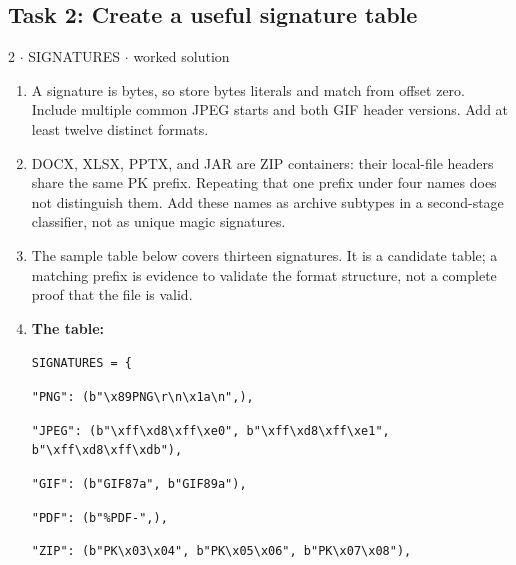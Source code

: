 \documentclass[11pt]{article}
\begin{document}
\begin{keepsection}\subsection{Task 2: Create a useful signature table}

\begin{workedbox}{2 \ensuremath{\cdot} SIGNATURES \ensuremath{\cdot} worked solution}
\begin{enumerate}
\item A signature is bytes, so store bytes literals and match from offset zero. Include multiple common JPEG starts and both GIF header versions. Add at least twelve distinct formats.
\item DOCX, XLSX, PPTX, and JAR are ZIP containers: their local-file headers share the same PK prefix. Repeating that one prefix under four names does not distinguish them. Add these names as archive subtypes in a second-stage classifier, not as unique magic signatures.
\item The sample table below covers thirteen signatures. It is a candidate table; a matching prefix is evidence to validate the format structure, not a complete proof that the file is valid.
\item {}
\textbf{The table:}
\begin{tcolorbox}[colback=Paperblue,colframe=Paperblue,boxrule=0pt,arc=0pt,left=7pt,right=7pt,top=5pt,bottom=5pt]\small\sloppy
\noindent\hspace*{0em}\texttt{SIGNATURES = \{}\par
\noindent\hspace*{1em}\texttt{"PNG": (b"\textbackslash{}x89PNG\textbackslash{}r\textbackslash{}n\textbackslash{}x1a\textbackslash{}n",),}\par
\noindent\hspace*{1em}\texttt{"JPEG": (b"\textbackslash{}xff\textbackslash{}xd8\textbackslash{}xff\textbackslash{}xe0", b"\textbackslash{}xff\textbackslash{}xd8\textbackslash{}xff\textbackslash{}xe1", b"\textbackslash{}xff\textbackslash{}xd8\textbackslash{}xff\textbackslash{}xdb"),}\par
\noindent\hspace*{1em}\texttt{"GIF": (b"GIF87a", b"GIF89a"),}\par
\noindent\hspace*{1em}\texttt{"PDF": (b"\%PDF-",),}\par
\noindent\hspace*{1em}\texttt{"ZIP": (b"PK\textbackslash{}x03\textbackslash{}x04", b"PK\textbackslash{}x05\textbackslash{}x06", b"PK\textbackslash{}x07\textbackslash{}x08"),}\par

\end{tcolorbox}
\end{enumerate}
\end{workedbox}
\end{keepsection}
\end{document}
